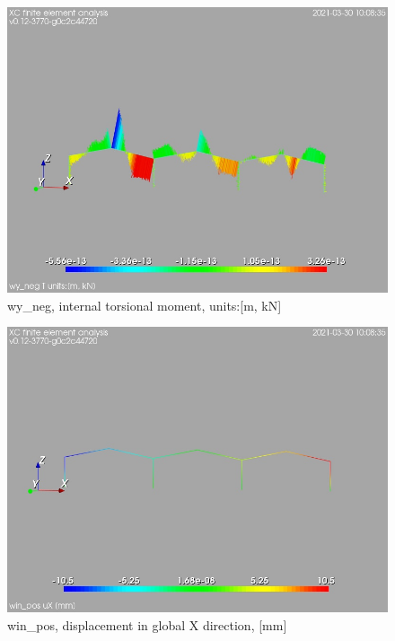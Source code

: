 \begin{figure}
\begin{center}
\includegraphics[width=\linewidth]{calc_results/sole_zeinali/text/graphics/resSimplLC/wy_negallMemberSetT}
\caption{wy_neg, internal torsional moment, units:[m, kN]}
\end{center}
\end{figure}
\cleardoublepage
\begin{figure}
\begin{center}
\includegraphics[width=\linewidth]{calc_results/sole_zeinali/text/graphics/resSimplLC/win_postotaluX}
\caption{win_pos, displacement in global X direction, [mm]}
\end{center}
\end{figure}
